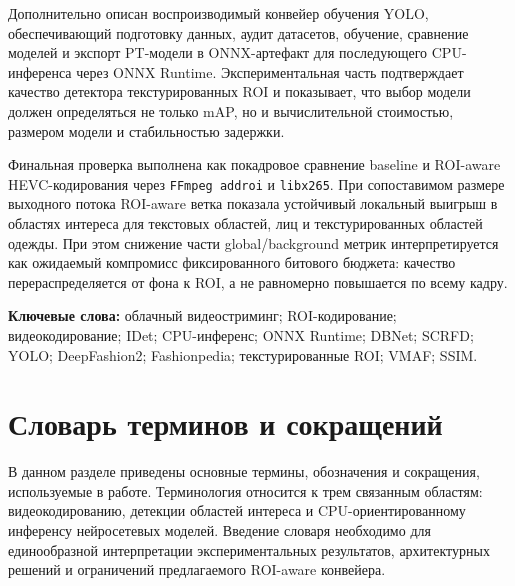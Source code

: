 \documentclass[12pt,a4paper,oneside,openany]{report}
\begin{document}
Дополнительно описан воспроизводимый конвейер обучения YOLO, обеспечивающий подготовку данных,
аудит датасетов, обучение, сравнение моделей и экспорт PT-модели в ONNX-артефакт для
последующего CPU-инференса через ONNX Runtime. Экспериментальная часть подтверждает качество
детектора текстурированных ROI и показывает, что выбор модели должен определяться не только mAP,
но и вычислительной стоимостью, размером модели и стабильностью задержки.

Финальная проверка выполнена как покадровое сравнение baseline и ROI-aware HEVC-кодирования через
\texttt{FFmpeg addroi} и \texttt{libx265}. При сопоставимом размере выходного потока
ROI-aware ветка показала устойчивый локальный выигрыш в областях интереса для текстовых областей,
лиц и текстурированных областей одежды. При этом снижение части global/background метрик
интерпретируется как ожидаемый компромисс фиксированного битового бюджета: качество
перераспределяется от фона к ROI, а не равномерно повышается по всему кадру.

\textbf{Ключевые слова:} облачный видеостриминг; ROI-кодирование; видеокодирование; IDet;
CPU-инференс; ONNX Runtime; DBNet; SCRFD; YOLO; DeepFashion2; Fashionpedia; текстурированные
ROI; VMAF; SSIM.


\clearpage
\tableofcontents
\clearpage


\chapter*{Словарь терминов и сокращений}
{}

В данном разделе приведены основные термины, обозначения и сокращения, используемые
в работе. Терминология относится к трем связанным областям: видеокодированию,
детекции областей интереса и CPU-ориентированному инференсу нейросетевых моделей.
Введение словаря необходимо для единообразной интерпретации экспериментальных
результатов, архитектурных решений и ограничений предлагаемого ROI-aware конвейера.
\end{document}
